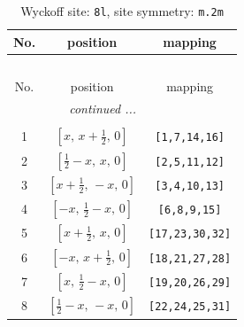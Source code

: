 \documentclass[fleqn,8pt]{jsarticle}
\begin{document}
\begin{longtable}{ccc}
\caption{Wyckoff site: {\tt 8l}, site symmetry: {\tt m.2m}}
 \\
 \hline \hline
No. & position & mapping \\ \hline \endfirsthead

\multicolumn{2}{l}{\tablename\ \thetable{}} \\
 \hline \hline
No. & position & mapping \\ \hline \endhead

 \hline \hline
\multicolumn{2}{r}{\footnotesize\it continued ...} \\ \endfoot

 \hline \hline
\multicolumn{2}{r}{} \\ \endlastfoot

1 & $\left[ x,\, x + \frac{1}{2},\, 0 \right]$ & {\tt [1,7,14,16]} \\ \hline
2 & $\left[ \frac{1}{2} - x,\, x,\, 0 \right]$ & {\tt [2,5,11,12]} \\ \hline
3 & $\left[ x + \frac{1}{2},\, - x,\, 0 \right]$ & {\tt [3,4,10,13]} \\ \hline
4 & $\left[ - x,\, \frac{1}{2} - x,\, 0 \right]$ & {\tt [6,8,9,15]} \\ \hline
5 & $\left[ x + \frac{1}{2},\, x,\, 0 \right]$ & {\tt [17,23,30,32]} \\ \hline
6 & $\left[ - x,\, x + \frac{1}{2},\, 0 \right]$ & {\tt [18,21,27,28]} \\ \hline
7 & $\left[ x,\, \frac{1}{2} - x,\, 0 \right]$ & {\tt [19,20,26,29]} \\ \hline
8 & $\left[ \frac{1}{2} - x,\, - x,\, 0 \right]$ & {\tt [22,24,25,31]} \\
\end{longtable}
\renewcommand{\arraystretch}{1.2}
\end{document}
